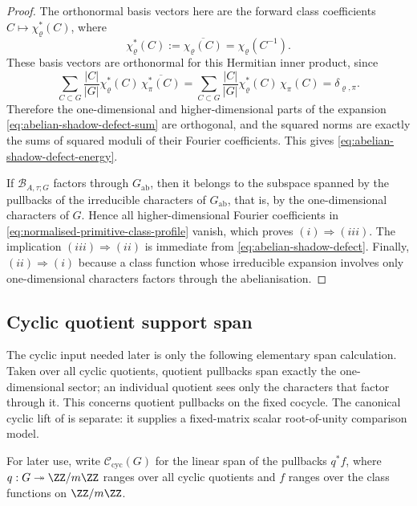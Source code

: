 \begin{proof}
  The orthonormal basis vectors here are the forward class coefficients
  \(C\mapsto \chi_\varrho^\ast(C)\), where
  \[
    \chi_\varrho^\ast(C):=\overline{\chi_\varrho(C)}
    =\chi_\varrho(C^{-1}).
  \]
  These basis vectors are orthonormal for this Hermitian inner product,
  since
  \[
    \sum_{C\subset G}\frac{|C|}{|G|}
      \chi_\varrho^\ast(C)\,\overline{\chi_\pi^\ast(C)}
    =
    \sum_{C\subset G}\frac{|C|}{|G|}
      \chi_\varrho^\ast(C)\,\chi_\pi(C)
    =
    \delta_{\varrho,\pi}.
  \]
  Therefore the one-dimensional and higher-dimensional parts of the
  expansion \eqref{eq:abelian-shadow-defect-sum} are orthogonal, and
  the squared norms are exactly the sums of squared moduli of their
  Fourier coefficients. This gives
  \eqref{eq:abelian-shadow-defect-energy}.

  If \(\mathcal B_{A,\tau;G}\) factors through \(G_{\mathrm{ab}}\), then it
  belongs to the subspace spanned by the pullbacks of the irreducible
  characters of \(G_{\mathrm{ab}}\), that is, by the one-dimensional
  characters of \(G\). Hence all higher-dimensional Fourier coefficients
  in \eqref{eq:normalised-primitive-class-profile} vanish, which proves
  \((i)\Rightarrow(iii)\). The implication \((iii)\Rightarrow(ii)\) is
  immediate from \eqref{eq:abelian-shadow-defect}. Finally,
  \((ii)\Rightarrow(i)\) because a class function whose irreducible
  expansion involves only one-dimensional characters factors through the
  abelianisation.
\end{proof}

\subsection{Cyclic quotient support span}

The cyclic input needed later is only the following elementary span
calculation.  Taken over all cyclic quotients, quotient pullbacks span exactly
the one-dimensional sector; an individual quotient sees only the characters
that factor through it.  This concerns quotient pullbacks on the fixed
cocycle.  The canonical cyclic lift of  is separate:
it supplies a fixed-matrix scalar root-of-unity comparison model.

For later use, write \(\mathscr C_{\mathrm{cyc}}(G)\) for the linear
span of the pullbacks \(q^\ast f\), where \(q:G\twoheadrightarrow \ZZ/m\ZZ\)
ranges over all cyclic quotients and \(f\) ranges over the class
functions on \(\ZZ/m\ZZ\).

